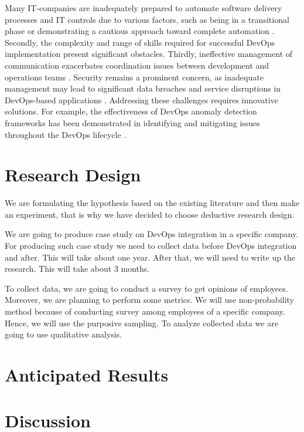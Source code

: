 \documentclass[oneside,final,12pt,a4paper]{extreport}
\begin{document}
Many IT-companies are inadequately prepared to automate software delivery processes and IT controls due to various factors, such as being in a transitional phase or demonstrating a cautious approach toward complete automation \cite{12}. Secondly, the complexity and range of skills required for successful DevOps implementation present significant obstacles. Thirdly, ineffective management of communication exacerbates coordination issues between development and operations teams \cite{7}. Security remains a prominent concern, as inadequate management may lead to significant data breaches and service disruptions in DevOps-based applications \cite{14}. Addressing these challenges requires innovative solutions. For example, the effectiveness of DevOps anomaly detection frameworks has been demonstrated in identifying and mitigating issues throughout the DevOps lifecycle \cite{13}.

\section{Research Design}

We are formulating the hypothesis based on the existing literature and then make an experiment, that is why we have decided to choose deductive research design.

We are going to produce case study on DevOps integration in a specific company. For producing such case study we need to collect data before DevOps integration and after. This will take about one year. After that, we will need to write up the research. This will take about 3 months.

To collect data, we are going to conduct a survey to get opinions of employees. Moreover, we are planning to perform some metrics. We will use non-probability method because of conducting survey among employees of a specific company. Hence, we will use the purposive sampling. To analyze collected data we are going to use qualitative analysis.

\section{Anticipated Results}



\section{Discussion}



\newpage
\printbibliography[heading=bibintoc,title={References}]
\end{document}
